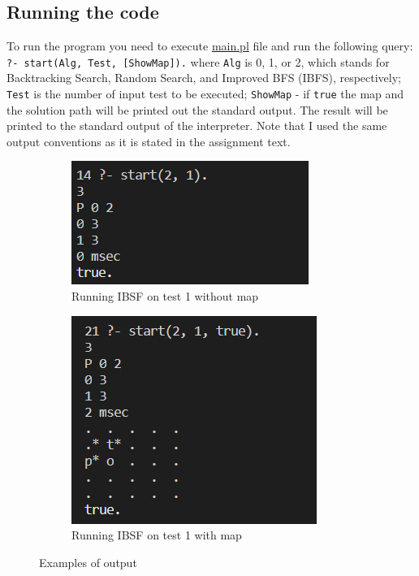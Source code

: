 \documentclass{article}
\begin{document}
\subsection{Running the code}
To run the program you need to execute \url{main.pl} file and run the following query: \texttt{?- start(Alg, Test, [ShowMap]).} where \texttt{Alg} is 0, 1, or 2, which stands for Backtracking Search, Random Search, and Improved BFS (IBFS), respectively; \texttt{Test} is the number of input test to be executed; \texttt{ShowMap} - if \texttt{true} the map and the solution path will be printed out the standard output. The result will be printed to the standard output of the interpreter. Note that I used the same output conventions as it is stated in the assignment text.
\begin{figure}[ht]
   	 \centering
     \begin{subfigure}[b]{0.45\textwidth}
         \centering
         \includegraphics[width=\textwidth]{images/image4.png}
         \caption{Running IBSF on test 1 without map}
         \label{fig:output1}
     \end{subfigure}
     \hfill
     \begin{subfigure}[b]{0.45\textwidth}
         \centering
         \includegraphics[width=\textwidth]{images/image5.png}
         \caption{Running IBSF on test 1 with map}
         \label{fig:output2}
     \end{subfigure}
     \caption{Examples of output}
\end{figure} 
\end{document}
